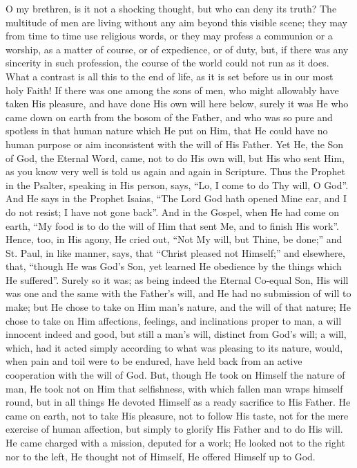 O my brethren, is it not a shocking thought, but who can deny its
truth? The multitude of men are living without any aim beyond this
visible scene; they may from time to time use religious words, or they
may profess a communion or a worship, as a matter of course, or of
expedience, or of duty, but, if there was any sincerity in such
profession, the course of the world could not run as it does. What a
contrast is all this to the end of life, as it is set before us in our
most holy Faith! If there was one among the sons of men, who might
allowably have taken His pleasure, and have done His own will here
below, surely it was He who came down on earth from the bosom of the
Father, and who was so pure and spotless in that human nature which He
put on Him, that He could have no human purpose or aim inconsistent
with the will of His Father. Yet He, the Son of God, the Eternal Word,
came, not to do His own will, but His who sent Him, as you know very
well is told us again and again in Scripture. Thus the Prophet in the
Psalter, speaking in His person, says, ``Lo, I come to do Thy
will, O God''. And He says in the Prophet Isaias, ``The Lord
God hath opened Mine ear, and I do not resist; I have not gone
back''. And in the Gospel, when He had come on earth, ``My
food is to do the will of Him that sent Me, and to finish His
work''. Hence, too, in His agony, He cried out, ``Not My will,
but Thine, be done;'' and St. Paul, in like manner, says, that
``Christ pleased not Himself;'' and elsewhere, that,
``though He was God's Son, yet learned He obedience by the things
which He suffered''. Surely so it was; as being indeed the Eternal
Co-equal Son, His will was one and the same with the Father's will,
and He had no submission of will to make; but He chose to take on Him
man's nature, and the will of that nature; He chose to take on Him
affections, feelings, and inclinations proper to man, a will innocent
indeed and good, but still a man's will, distinct from God's will; a
will, which, had it acted simply according to what was pleasing to its
nature, would, when pain and toil were to be endured, have held back
from an active cooperation with the will of God. But, though He took
on Himself the nature of man, He took not on Him that selfishness,
with which fallen man wraps himself round, but in all things He
devoted Himself as a ready sacrifice to His Father. He came on earth,
not to take His pleasure, not to follow His taste, not for the mere
exercise of human affection, but simply to glorify His Father and to
do His will. He came charged with a mission, deputed for a work; He
looked not to the right nor to the left, He thought not of Himself, He
offered Himself up to God.

